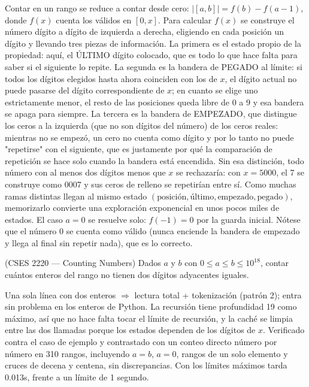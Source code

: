  Contar en un rango se reduce a contar desde cero: $|[a,b]| = f(b) - f(a-1)$, donde $f(x)$ cuenta los válidos en $[0, x]$. Para calcular $f(x)$ se construye el número dígito a dígito de izquierda a derecha, eligiendo en cada posición un dígito y llevando tres piezas de información. La primera es el estado propio de la propiedad: aquí, el ÚLTIMO dígito colocado, que es todo lo que hace falta para saber si el siguiente lo repite. La segunda es la bandera de PEGADO al límite: si todos los dígitos elegidos hasta ahora coinciden con los de $x$, el dígito actual no puede pasarse del dígito correspondiente de $x$; en cuanto se elige uno estrictamente menor, el resto de las posiciones queda libre de 0 a 9 y esa bandera se apaga para siempre. La tercera es la bandera de EMPEZADO, que distingue los ceros a la izquierda (que no son dígitos del número) de los ceros reales: mientras no se empezó, un cero no cuenta como dígito y por lo tanto no puede "repetirse" con el siguiente, que es justamente por qué la comparación de repetición se hace solo cuando la bandera está encendida. Sin esa distinción, todo número con al menos dos dígitos menos que $x$ se rechazaría: con $x = 5000$, el 7 se construye como 0007 y sus ceros de relleno se repetirían entre sí. Como muchas ramas distintas llegan al mismo estado $(\text{posición}, \text{último}, \text{empezado}, \text{pegado})$, memorizarlo convierte una exploración exponencial en unos pocos miles de estados. El caso $a = 0$ se resuelve solo: $f(-1) = 0$ por la guarda inicial. Nótese que el número 0 se cuenta como válido (nunca enciende la bandera de empezado y llega al final sin repetir nada), que es lo correcto.


(CSES 2220 — Counting Numbers) Dados $a$ y $b$ con $0 \le a \le b \le 10^{18}$, contar cuántos enteros del rango no tienen dos dígitos adyacentes iguales.

 Una sola línea con dos enteros $\Rightarrow$ lectura total + tokenización (patrón 2);  entra sin problema en los enteros de Python. La recursión tiene profundidad 19 como máximo, así que no hace falta tocar el límite de recursión, y la caché se limpia entre las dos llamadas porque los estados dependen de los dígitos de $x$. Verificado contra el caso de ejemplo y contrastado con un conteo directo número por número en 310 rangos, incluyendo $a = b$, $a = 0$, rangos de un solo elemento y cruces de decena y centena, sin discrepancias. Con los límites máximos tarda \aprox{}0.013s, frente a un límite de 1 segundo.

